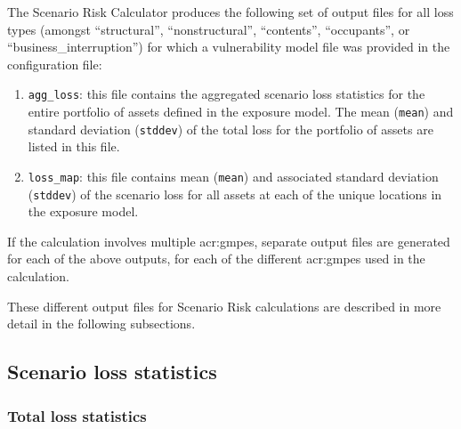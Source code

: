 The Scenario Risk Calculator produces the following set of output files for
all loss types (amongst ``structural'', ``nonstructural'', ``contents'',
``occupants'', or ``business\_interruption'') for which a vulnerability model
file was provided in the configuration file:

\begin{enumerate}

  \item \Verb+agg_loss+: this file contains the aggregated scenario
    loss statistics for the entire portfolio of \glspl{asset} defined
    in the \gls{exposure model}. The mean (\Verb+mean+) and standard
    deviation (\Verb+stddev+) of the total loss for the portfolio of
    \glspl{asset} are listed in this file.

  \item \Verb+loss_map+: this file contains mean (\Verb+mean+) and
    associated standard deviation (\Verb+stddev+) of the scenario loss for all
    \glspl{asset} at each of the unique locations in the \gls{exposure model}.

\end{enumerate}

If the calculation involves multiple \glspl{acr:gmpe}, separate output files
are generated for each of the above outputs, for each of the different
\glspl{acr:gmpe} used in the calculation.

These different output files for Scenario Risk calculations are described in
more detail in the following subsections.


\subsection{Scenario loss statistics}
\label{subsec:scenario_loss_statistics}



\subsubsection{Total loss statistics}
\label{subsubsec:scenario_total_loss_statistics}

